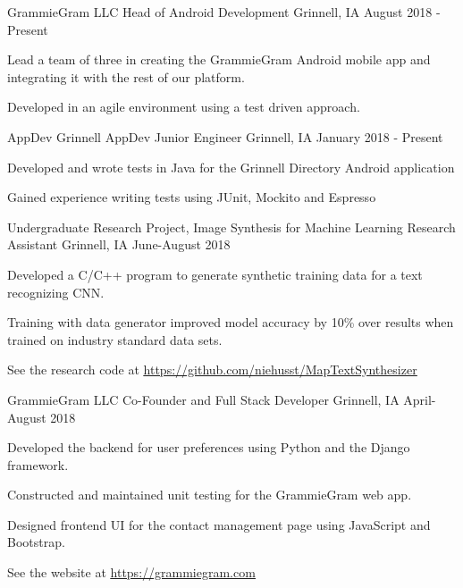 \documentclass[12pt, a4paper]{awesome-cv}
\begin{document}
\begin{cventries}

  \cventry
    {GrammieGram LLC}
    {Head of Android Development}
    {Grinnell, IA}
    {August 2018 - Present}
    {
      \begin{cvitems}
        \item {Lead a team of three in creating the GrammieGram Android mobile app and integrating it with the rest of our platform.}
	\item {Developed in an agile environment using a test driven approach.}
      \end{cvitems}
    }

  \cventry
    {AppDev Grinnell}
    {AppDev Junior Engineer}
    {Grinnell, IA}
    {January 2018 - Present}
    {
      \begin{cvitems}
        \item {Developed and wrote tests in Java for the Grinnell Directory Android application}
	\item {Gained experience writing tests using JUnit, Mockito and Espresso}
      \end{cvitems}
    }

  \cventry
    {Undergraduate Research Project, Image Synthesis for Machine Learning}
    {Research Assistant}
    {Grinnell, IA}
    {June-August 2018}
    {
      \begin{cvitems}
        \item {Developed a C/C++ program to generate synthetic training data for a text recognizing CNN.}
        \item{Training with data generator improved model accuracy by 10\% over results when trained on industry standard data sets.}
	\item{See the research code at \underline{\href{https://github.com/niehusst/MapTextSynthesizer}{https://github.com/niehusst/MapTextSynthesizer}}}
      \end{cvitems}
    }

  \cventry
    {GrammieGram LLC}
    {Co-Founder and Full Stack Developer}
    {Grinnell, IA}
    {April-August 2018}
    {
      \begin{cvitems}
        \item {Developed the backend for user preferences using Python and the Django framework.}
        \item {Constructed and maintained unit testing for the GrammieGram web app.}
        \item {Designed frontend UI for the contact management page using JavaScript and Bootstrap.}
	\item {See the website at \underline{\href{https://grammiegram.com}{https://grammiegram.com}}}
      \end{cvitems}
    }


\end{cventries}
\end{document}
